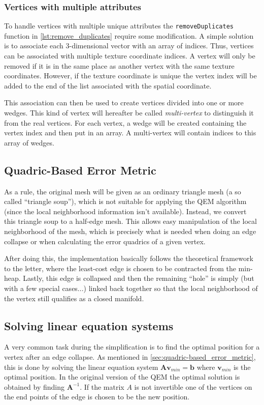 \begin{subs}
\subsubsection{Vertices with multiple attributes}
To handle vertices with multiple unique attributes the \texttt{removeDuplicates} function in \cref{lst:remove_duplicates} require some modification. A simple solution is to associate each 3-dimensional vector with an array of indices. Thus, vertices can be associated with multiple texture coordinate indices. A vertex will only be removed if it is in the same place as another vertex with the same texture coordinates. However, if the texture coordinate is unique the vertex index will be added to the end of the list associated with the spatial coordinate.

This association can then be used to create vertices divided into one or more wedges. This kind of vertex will hereafter be called \emph{multi-vertex} to distinguish it from the real vertices. For each vertex, a wedge will be created containing the vertex index and then put in an array. A multi-vertex will contain indices to this array of wedges. 
\end{subs}

\subsection{Quadric-Based Error Metric} \label{sec:quadric-based_error_metric2}
As a rule, the original mesh will be given as an ordinary triangle mesh (a so called ``triangle soup''), which is not suitable for applying the QEM algorithm (since the local neighborhood information isn't available). Instead, we convert this triangle soup to a half-edge mesh. This allows easy manipulation of the local neighborhood of the mesh, which is precisely what is needed when doing an edge collapse or when calculating the error quadrics of a given vertex.

After doing this, the implementation basically follows the theoretical framework to the letter, where the least-cost edge is chosen to be contracted from the min-heap. Lastly, this edge is collapsed and then the remaining ``hole'' is simply (but with a few special cases...) linked back together so that the local neighborhood of the vertex still qualifies as a closed manifold.

\subsection{Solving linear equation systems}
A very common task during the simplification is to find the optimal position for a vertex after an edge collapse. As mentioned in \cref{sec:quadric-based_error_metric}, this is done by solving the linear equation system \(\mathbf{A} \mathbf{v}_{min} = \mathbf{b}\) where \(\mathbf{v}_{min}\) is the optimal position. In the original version of the QEM the optimal solution is obtained by finding \(\mathbf{A}^{-1}\). If the matrix \(A\) is not invertible one of the vertices on the end points of the edge is chosen to be the new position.

